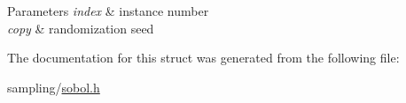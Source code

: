 \begin{DoxyParams}{\-Parameters}
{\em index} & instance number \\
\hline
{\em copy} & randomization seed \\
\hline
\end{DoxyParams}


\-The documentation for this struct was generated from the following file\-:\begin{DoxyCompactItemize}
\item 
sampling/\hyperlink{sobol_8h}{sobol.\-h}\end{DoxyCompactItemize}
